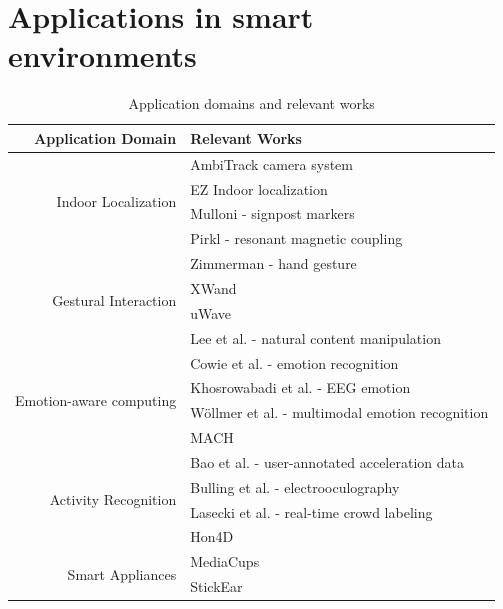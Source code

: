 \section{Applications in smart environments}

\begin{table}[htbp]
  \centering
  \caption{Application domains and relevant works}
    \begin{tabular}{rl}
    \toprule
    Application Domain & Relevant Works \\
    \midrule
    \multirow{4}[0]{*}{Indoor Localization} & AmbiTrack camera system \cite{braun2013ambitrack} \\
          & EZ Indoor localization \cite{ chintalapudi2010indoor} \\
          & Mulloni - signpost markers \cite{mulloni2009indoor} \\
          & Pirkl - resonant magnetic coupling \cite{pirkl2013resonant} \\ [1em]
    \multirow{4}[0]{*}{Gestural Interaction} & Zimmerman - hand gesture \cite{zimmerman1987hand} \\
          & XWand \cite{Wilson2003} \\
          & uWave \cite{liu2009uwave} \\
          & Lee et al. - natural content manipulation \cite{lee2013towards} \\[1em]
    \multirow{4}[0]{*}{Emotion-aware computing} & Cowie et al. - emotion recognition \cite{cowie2001emotion} \\
          & Khosrowabadi et al. - EEG emotion \cite{khosrowabadi2010eeg} \\
          & Wöllmer et al. - multimodal emotion recognition \cite{wollmer2010context} \\
          & MACH \cite{hoque2013mach} \\[1em]
    \multirow{4}[0]{*}{Activity Recognition} & Bao et al. - user-annotated acceleration data \cite{Bao2004} \\
          & Bulling et al. - electrooculography \cite{bulling2011eye} \\
          & Lasecki et al. - real-time crowd labeling \cite{lasecki2013real} \\
          & Hon4D \cite{oreifej2013hon4d} \\[1em]
    \multirow{4}[0]{*}{Smart Appliances} & MediaCups \cite{gellersen1999mediacup} \\
          & StickEar \cite{yeo2013stickear} \\

\end{tabular}
\end{table}
